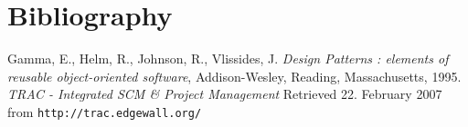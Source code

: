 \documentclass[11pt]{book}
\begin{document}
\maketitle
\fi

\chapter{Bibliography} \label{chapter-bibliography}

\begin{thebibliography}{99}
 Gamma, E., Helm, R., Johnson, R., Vlissides, J. {\it Design Patterns : elements of reusable object-oriented software}, Addison-Wesley, Reading, Massachusetts, 1995.
  {\it TRAC - Integrated SCM \& Project Management} Retrieved 22. February 2007 from {\tt http://trac.edgewall.org/}
\end{thebibliography}

\ifx\collected\undefined
\end{document}
